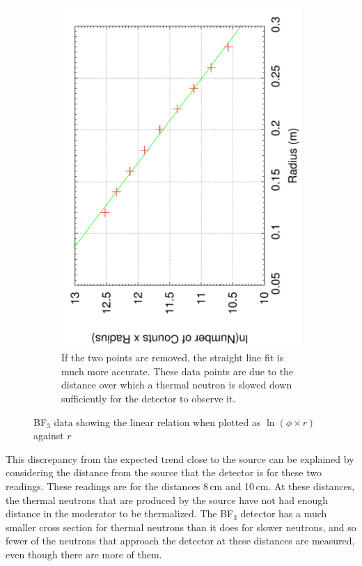 \begin{figure}[ht]
\begin{subfigure}[b]{0.48\textwidth}
  \end{subfigure}
  ~
  \begin{subfigure}[b]{0.48\textwidth}
   \centering
    \includegraphics[angle=270,width=\textwidth]{BF3data2.pdf}
    \caption{If the two points are removed, the straight line fit is much more accurate. These data points are due to the distance over which a thermal neutron is slowed down sufficiently for the detector to observe it. \label{fig:bf3data2}}
  \end{subfigure}
  \caption{BF$_3$ data showing the linear relation when plotted as $\ln(\phi\times r)$ against $r$}
\end{figure}

This discrepancy from the expected trend close to the source can be explained by considering the distance from the source that the detector is for these two readings. These readings are for the distances 8\,cm and 10\,cm. At these distances, the thermal neutrons that are produced by the source have not had enough distance in the moderator to be thermalized. The BF$_3$ detector has a much smaller cross section for thermal neutrons than it does for slower neutrons, and so fewer of the neutrons that approach the detector at these distances are measured, even though there are more of them.

